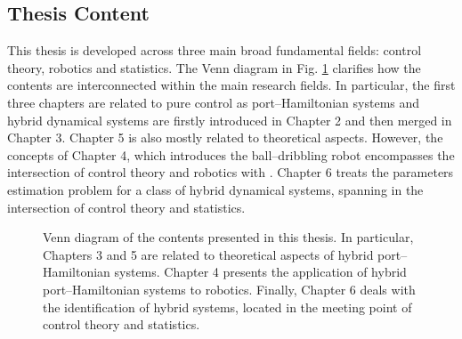 \subsection{Thesis Content}
This thesis is developed across three main broad fundamental fields: control theory, robotics and statistics. The Venn diagram in Fig. \ref{fig:venn} clarifies how the contents are interconnected within the main research fields. In particular, the first three chapters are related to pure control as port--Hamiltonian systems and hybrid dynamical systems are firstly introduced in Chapter 2 and then merged in Chapter 3. Chapter 5 is also mostly related to theoretical aspects. However, the concepts of Chapter 4, which introduces the ball--dribbling robot encompasses the intersection of control theory and robotics with . Chapter 6 treats the parameters estimation problem for a class of hybrid dynamical systems, spanning in the intersection of control theory and statistics.

\begin{figure}
    \centering
    
    \vspace{5mm}
    \caption{Venn diagram of the contents presented in this thesis. In particular, Chapters 3 and 5 are related to theoretical aspects of hybrid port--Hamiltonian systems. Chapter 4 presents the application of hybrid port--Hamiltonian systems to robotics. Finally, Chapter 6 deals with the identification of hybrid systems, located in the meeting point of control theory and statistics.}
    \label{fig:venn}
\end{figure}

